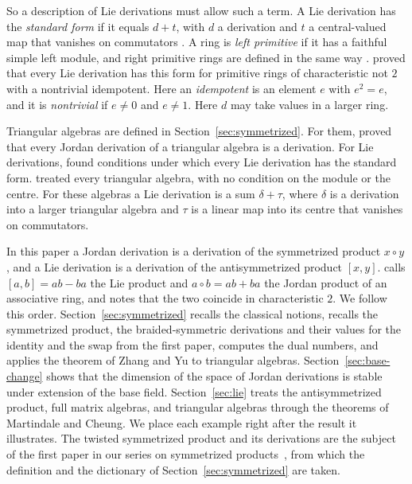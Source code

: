 \documentclass[]{interact}
\theoremstyle{plain}
\theoremstyle{definition}
\theoremstyle{remark}
\begin{document}
So a description of Lie derivations must allow such a term.
A Lie derivation has the \emph{standard form} if it equals $d + t$, with $d$ a derivation and $t$ a central-valued map that vanishes on commutators \citep[\S1]{Cheung2003}.
A ring is \emph{left primitive} if it has a faithful simple left module, and right primitive rings are defined in the same way \citep[Definition 11.2]{Lam2001}.
\citet[Theorem 2]{Martindale1964} proved that every Lie derivation has this form for primitive rings of characteristic not $2$ with a nontrivial idempotent.
Here an \emph{idempotent} is an element $e$ with $e^2 = e$, and it is \emph{nontrivial} if $e \neq 0$ and $e \neq 1$.
Here $d$ may take values in a larger ring.


Triangular algebras are defined in Section~\ref{sec:symmetrized}.
For them, \citet[Theorem 2.1]{ZhangYu2006} proved that every Jordan derivation of a triangular algebra is a derivation.
For Lie derivations, \citet[Theorem 11]{Cheung2003} found conditions under which every Lie derivation has the standard form.
\citet[Theorem 3.1 and Corollary 3.1]{Wang2019} treated every triangular algebra, with no condition on the module or the centre. For these algebras a Lie derivation is a sum $\delta + \tau$, where $\delta$ is a derivation into a larger triangular algebra and $\tau$ is a linear map into its centre that vanishes on commutators.


In this paper a Jordan derivation is a derivation of the symmetrized product $x \circ y$ \citep[Example 2.1]{BresarZelmanov2025}, and a Lie derivation is a derivation of the antisymmetrized product $[x,y]$. %
\citet[\S2]{Herstein1961} calls $[a,b] = ab - ba$ the Lie product and $a \circ b = ab + ba$ the Jordan product of an associative ring, and notes that the two coincide in characteristic $2$.
We follow this order.
Section~\ref{sec:symmetrized} recalls the classical notions, recalls the symmetrized product, the braided-symmetric derivations and their values for the identity and the swap from the first paper, computes the dual numbers, and applies the theorem of Zhang and Yu to triangular algebras.
Section~\ref{sec:base-change} shows that the dimension of the space of Jordan derivations is stable under extension of the base field.
Section~\ref{sec:lie} treats the antisymmetrized product, full matrix algebras, and triangular algebras through the theorems of Martindale and Cheung.
We place each example right after the result it illustrates.
The twisted symmetrized product and its derivations are the subject of the first paper in our series on symmetrized products~\cite{Adrabi2026a}, from which the definition and the dictionary of Section~\ref{sec:symmetrized} are taken.
\end{document}
